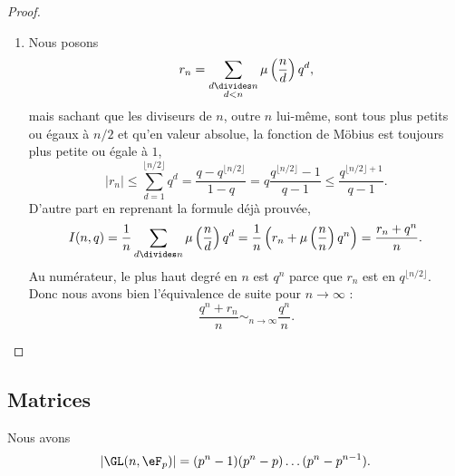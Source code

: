 \begin{proof}
\begin{enumerate}
		\item
		      Nous posons
		      \begin{equation}
			      r_n=\sum_{\substack{d\divides n\\d<n}}\mu\left( \frac{ n }{ d } \right)q^d,
		      \end{equation}
		      mais sachant que les diviseurs de \( n\), outre \( n\) lui-même, sont tous plus petits ou égaux à \( n/2\) et qu'en valeur absolue, la fonction de Möbius est toujours plus petite ou égale à \( 1\),
		      \begin{equation}
			      | r_n |\leq\sum_{d=1}^{\lfloor n/2\rfloor}q^d=\frac{ q-q^{\lfloor n/2 \rfloor} }{ 1-q }=q\frac{ q^{\lfloor n/2 \rfloor}-1 }{ q-1 }\leq \frac{ q^{\lfloor n/2 \rfloor+1} }{ q-1 }.
		      \end{equation}
		      D'autre part en reprenant la formule déjà prouvée,
		      \begin{equation}
			      I(n,q)=\frac{1}{ n }\sum_{d\divides n}\mu\left( \frac{ n }{ d } \right)q^d=\frac{1}{ n }\left( r_n+\mu\left( \frac{ n }{ n } \right)q^n \right)=\frac{ r_n+q^n }{ n }.
		      \end{equation}
		      Au numérateur, le plus haut degré en \( n\) est \( q^n\) parce que \( r_n\) est en \( q^{\lfloor n/2\rfloor}\). Donc nous avons bien l'équivalence de suite pour \( n\to \infty\) :
		      \begin{equation}
			      \frac{ q^n+r_n }{ n }\sim_{n\to\infty}\frac{ q^n }{ n }.
		      \end{equation}
	\end{enumerate}
\end{proof}

\subsection{Matrices}

\begin{proposition}
	Nous avons
	\begin{equation}
		| \GL(n,\eF_p) |=(p^n-1)(p^n-p)\ldots (p^n-p^{n-1}).
	\end{equation}
\end{proposition}

